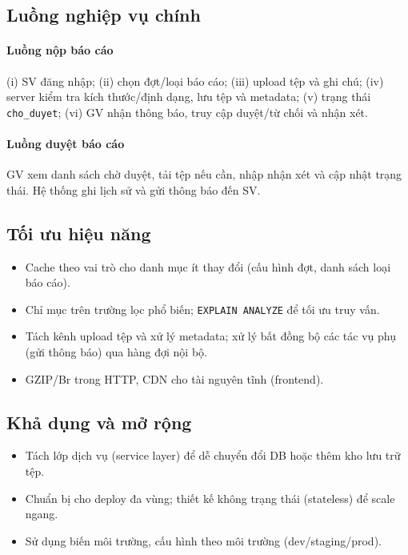 \documentclass[conference]{IEEEtran}
\begin{document}
\subsection{Luồng nghiệp vụ chính}
\paragraph{Luồng nộp báo cáo} (i) SV đăng nhập; (ii) chọn đợt/loại báo cáo; (iii) upload tệp và ghi chú; (iv) server kiểm tra kích thước/định dạng, lưu tệp và metadata; (v) trạng thái \texttt{cho\_duyet}; (vi) GV nhận thông báo, truy cập duyệt/từ chối và nhận xét.

\paragraph{Luồng duyệt báo cáo} GV xem danh sách chờ duyệt, tải tệp nếu cần, nhập nhận xét và cập nhật trạng thái. Hệ thống ghi lịch sử và gửi thông báo đến SV.


\subsection{Tối ưu hiệu năng}
\begin{itemize}
  \item Cache theo vai trò cho danh mục ít thay đổi (cấu hình đợt, danh sách loại báo cáo).
  \item Chỉ mục trên trường lọc phổ biến; \texttt{EXPLAIN ANALYZE} để tối ưu truy vấn.
  \item Tách kênh upload tệp và xử lý metadata; xử lý bất đồng bộ các tác vụ phụ (gửi thông báo) qua hàng đợi nội bộ.
  \item GZIP/Br trong HTTP, CDN cho tài nguyên tĩnh (frontend).
\end{itemize}

\subsection{Khả dụng và mở rộng}
\begin{itemize}
  \item Tách lớp dịch vụ (service layer) để dễ chuyển đổi DB hoặc thêm kho lưu trữ tệp.
  \item Chuẩn bị cho deploy đa vùng; thiết kế không trạng thái (stateless) để scale ngang.
  \item Sử dụng biến môi trường, cấu hình theo môi trường (dev/staging/prod).
\end{itemize}
\end{document}
